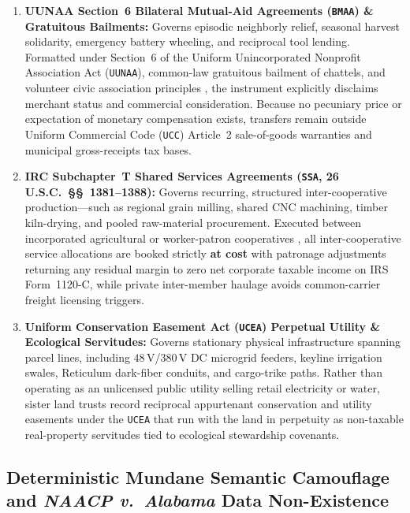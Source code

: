 \begin{enumerate}
  \item \textbf{UUNAA Section~6 Bilateral Mutual-Aid Agreements (\texttt{BMAA}) \& Gratuitous Bailments:} Governs episodic neighborly relief, seasonal harvest solidarity, emergency battery wheeling, and reciprocal tool lending. Formatted under Section~6 of the Uniform Unincorporated Nonprofit Association Act (\texttt{UUNAA}), common-law gratuitous bailment of chattels, and volunteer civic association principles \parencite{alamo1985}, the instrument explicitly disclaims merchant status and commercial consideration. Because no pecuniary price or expectation of monetary compensation exists, transfers remain outside Uniform Commercial Code (\texttt{UCC}) Article~2 sale-of-goods warranties and municipal gross-receipts tax bases.
  \item \textbf{IRC Subchapter~T Shared Services Agreements (\texttt{SSA}, 26 U.S.C.\ \S\S~1381--1388):} Governs recurring, structured inter-cooperative production---such as regional grain milling, shared CNC machining, timber kiln-drying, and pooled raw-material procurement. Executed between incorporated agricultural or worker-patron cooperatives \parencite{ica1995}, all inter-cooperative service allocations are booked strictly \textbf{at cost} with patronage adjustments returning any residual margin to zero net corporate taxable income on IRS Form~1120-C, while private inter-member haulage avoids common-carrier freight licensing triggers.
  \item \textbf{Uniform Conservation Easement Act (\texttt{UCEA}) Perpetual Utility \& Ecological Servitudes:} Governs stationary physical infrastructure spanning parcel lines, including $48\,\mathrm{V}$/$380\,\mathrm{V}$ DC microgrid feeders, keyline irrigation swales, Reticulum dark-fiber conduits, and cargo-trike paths. Rather than operating as an unlicensed public utility selling retail electricity or water, sister land trusts record reciprocal appurtenant conservation and utility easements under the \texttt{UCEA} that run with the land in perpetuity as non-taxable real-property servitudes tied to ecological stewardship covenants.
\end{enumerate}

\subsection{Deterministic Mundane Semantic Camouflage and \emph{NAACP v.\ Alabama} Data Non-Existence}

